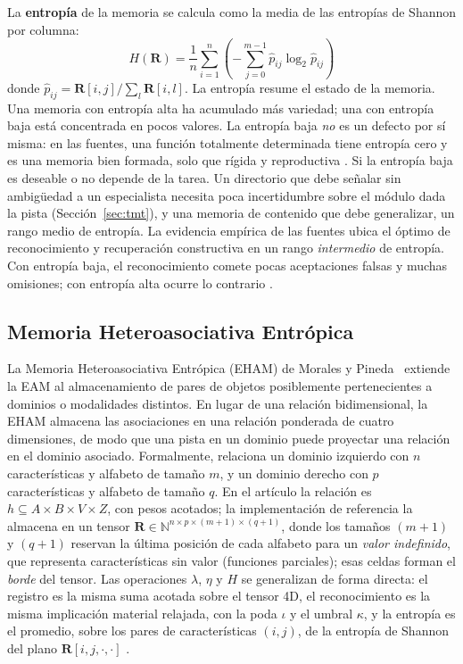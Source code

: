 La \textbf{entropía} de la memoria se calcula como la media de las entropías de Shannon
por columna:
\begin{equation}
    H(\mathbf{R}) = \frac{1}{n} \sum_{i=1}^{n} \left(-\sum_{j=0}^{m-1} \hat{p}_{ij} \log_2 \hat{p}_{ij}\right)
    \label{eq:entropia}
\end{equation}
donde $\hat{p}_{ij} = \mathbf{R}[i,j] / \sum_l \mathbf{R}[i,l]$.
La entropía resume el estado de la memoria.
Una memoria con entropía alta ha acumulado más variedad; una con entropía baja está
concentrada en pocos valores.
La entropía baja \emph{no} es un defecto por sí misma: en las
fuentes, una función totalmente determinada tiene entropía cero y es una
memoria bien formada, solo que rígida y reproductiva
\cite{pineda2021entropic,morales2022manuscript}.
Si la entropía baja es deseable o no depende de la tarea.
Un directorio que debe señalar sin ambigüedad a un especialista necesita poca
incertidumbre sobre el módulo dada la pista (Sección~\ref{sec:tmt}), y una memoria de
contenido que debe generalizar, un rango medio de entropía.
La evidencia empírica de las fuentes ubica el óptimo de reconocimiento y recuperación
constructiva en un rango \emph{intermedio} de entropía.
Con entropía baja, el reconocimiento comete pocas aceptaciones falsas y muchas
omisiones; con entropía alta ocurre lo contrario \cite{pineda2023imagery}.

\subsection{Memoria Heteroasociativa Entrópica}
\label{sec:hetero4d}

La Memoria Heteroasociativa Entrópica (EHAM) de Morales y
Pineda~\cite{morales2025missing}
extiende la EAM al almacenamiento de pares de objetos posiblemente pertenecientes a
dominios o modalidades distintos.
En lugar de una relación bidimensional, la EHAM almacena las asociaciones en una relación
ponderada de cuatro dimensiones, de modo que una pista en un dominio puede proyectar una
relación en el dominio asociado.
Formalmente, relaciona un dominio izquierdo con $n$ características y alfabeto de tamaño $m$,
y un dominio derecho con $p$ características y alfabeto de tamaño $q$.
En el artículo la relación es $h \subseteq A \times B \times V \times Z$, con pesos
acotados; la implementación de referencia la almacena en un tensor
$\mathbf{R} \in \mathbb{N}^{n \times p \times (m+1) \times (q+1)}$,
donde los tamaños $(m+1)$ y $(q+1)$ reservan la última posición de cada alfabeto para
un \emph{valor indefinido}, que representa características sin valor (funciones
parciales); esas celdas forman el \emph{borde} del tensor.
Las operaciones $\lambda$, $\eta$ y $H$ se generalizan de forma directa: el registro es
la misma suma acotada sobre el tensor 4D, el reconocimiento es la misma implicación
material relajada, con la poda $\iota$ y el umbral $\kappa$, y la entropía es el
promedio, sobre los pares de características $(i, j)$, de la entropía de Shannon del plano
$\mathbf{R}[i, j, \cdot, \cdot]$ \cite{morales2025missing}.

